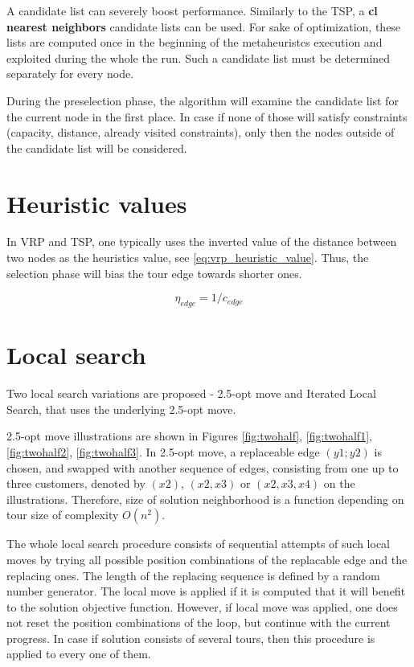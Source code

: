 \documentclass[11pt,a4paper,oneside]{book}
\begin{document}
A candidate list can severely boost performance. Similarly to the TSP, a \textbf{cl nearest neighbors} candidate lists can be used. For sake of optimization, these lists are computed once in the beginning of the metaheuristcs execution and exploited during the whole the run. Such a candidate list must be determined separately for every node.

During the preselection phase, the algorithm will examine the candidate list for the current node in the first place. In case if none of those will satisfy constraints (capacity, distance, already visited constraints), only then the nodes outside of the candidate list will be considered.

\section{Heuristic values}

In VRP and TSP, one typically uses the inverted value of the distance between two nodes as the heuristics value, see \eqref{eq:vrp_heuristic_value}. Thus, the selection phase will bias the tour edge towards shorter ones.

\begin{equation}
\label{eq:vrp_heuristic_value}
\eta_{edge} = 1 / c_{edge}
\end{equation}

\section{Local search}

Two local search variations are proposed - 2.5-opt move \cite{Stattenberger2007} and Iterated Local Search, that uses the underlying 2.5-opt move. 

2.5-opt move illustrations are shown in Figures \ref{fig:twohalf}, \ref{fig:twohalf1}, \ref{fig:twohalf2}, \ref{fig:twohalf3}. In 2.5-opt move, a replaceable edge $(y1;y2)$ is chosen, and swapped with another sequence of edges, consisting from one up to three customers, denoted by $(x2)$, $(x2,x3)$ or $(x2,x3,x4)$ on the illustrations. Therefore, size of solution neighborhood is a function depending on tour size of complexity $O(n^2)$.

The whole local search procedure consists of sequential attempts of such local moves by trying all possible position combinations of the replacable edge and the replacing ones. The length of the replacing sequence is defined by a random number generator. The local move is applied if it is computed that it will benefit to the solution objective function. However, if local move was applied, one does not reset the position combinations of the loop, but continue with the current progress. In case if solution consists of several tours, then this procedure is applied to every one of them.
\end{document}

